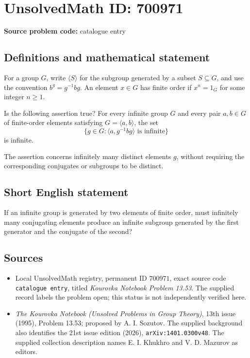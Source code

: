 \documentclass[11pt]{article}
\begin{document}
\section*{UnsolvedMath ID: 700971}
\textbf{Source problem code:} catalogue entry
\subsection{Definitions and mathematical statement}
For a group \(G\), write \(\langle S\rangle\) for the subgroup generated by a subset \(S\subseteq G\), and use the convention \(b^g=g^{-1}bg\). An element \(x\in G\) has finite order if \(x^n=1_G\) for some integer \(n\geq 1\).

Is the following assertion true? For every infinite group \(G\) and every pair \(a,b\in G\) of finite-order elements satisfying \(G=\langle a,b\rangle\), the set
\[
\bigl\{g\in G : \langle a,g^{-1}bg\rangle\text{ is infinite}\bigr\}
\]
is infinite.

The assertion concerns infinitely many distinct elements \(g\), without requiring the corresponding conjugates or subgroups to be distinct.
\subsection{Short English statement}
If an infinite group is generated by two elements of finite order, must infinitely many conjugating elements produce an infinite subgroup generated by the first generator and the conjugate of the second?
\subsection{Sources}
\begin{itemize}
\item Local UnsolvedMath registry, permanent ID \(700971\), exact source code \texttt{catalogue entry}, titled \emph{Kourovka Notebook Problem 13.53}. The supplied record labels the problem open; this status is not independently verified here.
\item \emph{The Kourovka Notebook (Unsolved Problems in Group Theory)}, 13th issue (1995), Problem 13.53; proposed by A. I. Sozutov. The supplied background also identifies the 21st issue edition (2026), \texttt{arXiv:1401.0300v48}. The supplied collection description names E. I. Khukhro and V. D. Mazurov as editors.
\end{itemize}
\end{document}
